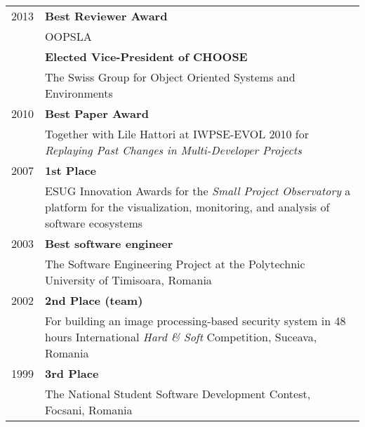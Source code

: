 \newcommand {\award}[3]{{\small #3} & {\bf #1} \\ & #2 \vspace{0.7em}\\ }

\begin{tabular}{p{1cm}p{12cm}}

	\award
		{Best Reviewer Award}
		{OOPSLA}
		{2013}

	\award 
		{Elected Vice-President of CHOOSE}
		{The Swiss Group for Object Oriented Systems and Environments}
		{}

	\award
		{Best Paper Award}
		{Together with Lile Hattori at IWPSE-EVOL 2010 for {\em Replaying Past Changes in Multi-Developer Projects}}
		{2010}

	\award
		{1st Place}
		{ESUG Innovation Awards for the {\em Small Project Observatory} a platform for the visualization, monitoring, and analysis of software ecosystems}
		{2007}


	\award
		{Best software engineer}
		{The Software Engineering Project at the Polytechnic University of Timisoara, Romania}
		{2003}

	\award
		{2nd Place (team)}
		{For building an image processing-based security system in 48 hours International {\em Hard \& Soft} Competition, Suceava, Romania}
		{2002}

	\award
		{3rd Place}
		{The National Student Software Development Contest, Focsani, Romania}
		{1999}




\end{tabular}




%

